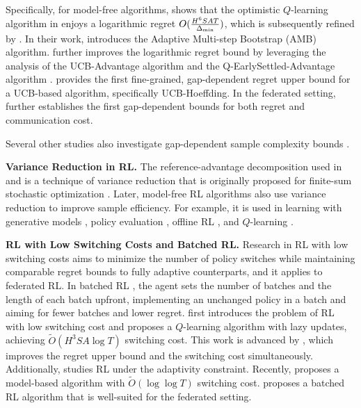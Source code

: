 \documentclass{article}
\def\dmin{\Delta_{\textnormal{min}}}
\begin{document}
Specifically, for model-free algorithms, \cite{yang2021q} shows that the optimistic $Q$-learning algorithm in \cite{jin2018q} enjoys a logarithmic regret $O(\frac{H^6SAT}{\dmin})$, which is subsequently refined by \cite{xu2021fine}. In their work, \cite{xu2021fine} introduces the Adaptive Multi-step Bootstrap (AMB) algorithm. \cite{zheng2024gap} further improves the logarithmic regret bound by leveraging the analysis of the UCB-Advantage algorithm \cite{zhang2020almost} and the Q-EarlySettled-Advantage algorithm \cite{li2023breaking}. \cite{zhang2025q} provides the first fine-grained, gap-dependent regret upper bound for a UCB-based algorithm, specifically UCB-Hoeffding. In the federated setting, \cite{zhang2025gapdependent} further establishes the first gap-dependent bounds for both regret and communication cost.

Several other studies also investigate gap-dependent sample complexity bounds \cite{al2021navigating, jonsson2020planning, marjani2020best, tirinzoni2022near, tirinzoni2023optimistic, wagenmaker2022instance, wagenmaker2022beyond, wang2022gap}.

\textbf{Variance Reduction in RL.} The reference-advantage decomposition used in \cite{li2023breaking} and \cite{zhang2020almost} is a technique of variance reduction that is originally proposed for finite-sum stochastic optimization \cite{gower2020variance,johnson2013accelerating,nguyen2017sarah}. Later, model-free RL algorithms also use variance reduction to improve sample efficiency. For example, it is used in learning with generative models \cite{sidford2018near,sidford2023variance,wainwright2019variance}, policy evaluation \cite{du2017stochastic,khamaru2021temporal,wai2019variance,xu2020reanalysis}, offline RL \cite{shi2022pessimistic,yin2021near}, and $Q$-learning \cite{li2023breaking,li2020sample,yan2022efficacy,zhang2020almost}.

\textbf{RL with Low Switching Costs and Batched RL.} Research in RL with low switching costs aims to minimize the number of policy switches while maintaining comparable regret bounds to fully adaptive counterparts, and it applies to federated RL. In batched RL \cite{gao2019batched,perchet2016batched}, the agent sets the number of batches and the length of each batch upfront, implementing an unchanged policy in a batch and aiming for fewer batches and lower regret. \cite{bai2019provably} first introduces the problem of RL with low switching cost and proposes a $Q$-learning algorithm with lazy updates, achieving $\tilde{O}(H^3SA\log T)$ switching cost. This work is advanced by \cite{zhang2020almost}, which improves the regret upper bound and the switching cost simultaneously. Additionally, \cite{wang2021provably} studies RL under the adaptivity constraint. Recently, \cite{qiao2022sample} proposes a model-based algorithm with $\tilde{O}(\log \log T)$ switching cost. \cite{zhang2022near} proposes a batched RL algorithm that is well-suited for the federated setting.
\end{document}
